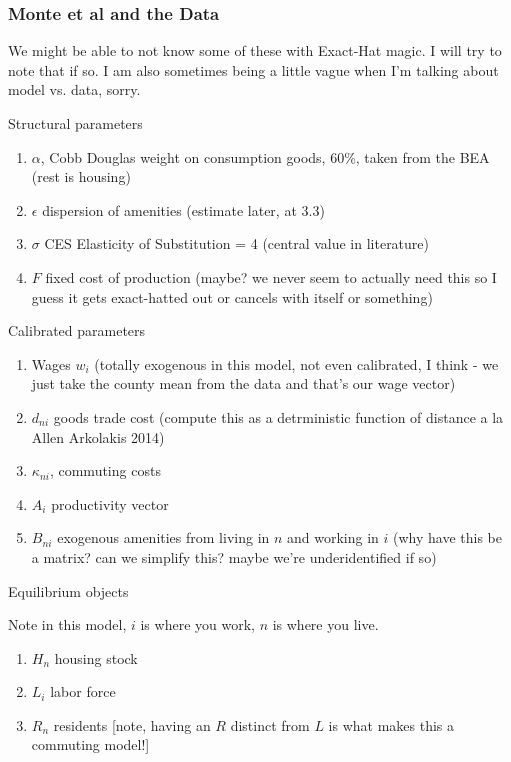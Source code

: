 \documentclass{article}
\begin{document}
\subsubsection{Monte et al and the Data}
We might be able to not know some of these with Exact-Hat magic. I will try to note that if so.
I am also sometimes being a little vague when I'm talking about model vs. data, sorry.

Structural parameters
\begin{enumerate}
\item $\alpha$, Cobb Douglas weight on consumption goods, 60\%, taken from the BEA (rest is housing)
\item $\epsilon$ dispersion of amenities (estimate later, at 3.3)
\item $\sigma$ CES Elasticity of Substitution = 4 (central value in literature)
\item $F$ fixed cost of production (maybe? we never seem to actually need this so I guess it gets exact-hatted out or cancels with itself or something)
\end{enumerate}
Calibrated parameters
\begin{enumerate}
\item Wages $w_i$ (totally exogenous in this model, not even calibrated, I think - we just take the county mean from the data and that's our wage vector)
\item $d_{ni}$ goods trade cost (compute this as a detrministic function of distance a la Allen Arkolakis 2014)
\item $\kappa_{ni}$, commuting costs
\item $A_i$ productivity vector
\item $B_{ni}$ exogenous amenities from living in $n$ and working in $i$ (why have this be a matrix? can we simplify this? maybe we're underidentified if so)
\end{enumerate} 

Equilibrium objects

Note in this model, $i$ is where you work, $n$ is where you live.
\begin{enumerate}
\item $H_n$ housing stock
\item $L_i$ labor force
\item $R_n$ residents [note, having an $R$ distinct from $L$ is what makes this a commuting model!]
\end{enumerate}
\end{document}
